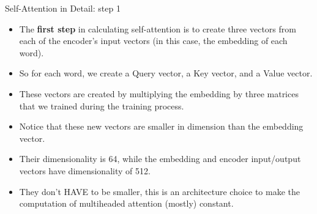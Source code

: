 \documentclass[handout]{beamer}
\begin{document}
\begin{frame}{Self-Attention in Detail: step 1}
\begin{scriptsize}



\begin{itemize}


\item The \textbf{first step} in calculating self-attention is to create three vectors from each of the encoder's input vectors (in this case, the embedding of each word).

\item So for each word, we create a Query vector, a Key vector, and a Value vector.

\item These vectors are created by multiplying the embedding by three matrices that we trained during the training process.

\item Notice that these new vectors are smaller in dimension than the embedding vector. 

\item Their dimensionality is 64, while the embedding and encoder input/output vectors have dimensionality of 512. 

\item They don’t HAVE to be smaller, this is an architecture choice to make the computation of multiheaded attention (mostly) constant.

\end{itemize}

\end{scriptsize}


\end{frame}
\end{document}

